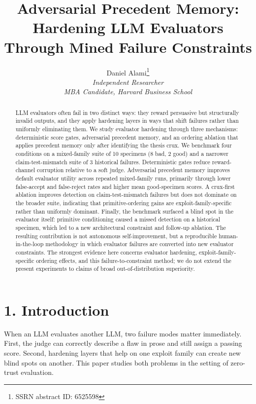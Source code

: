 \documentclass[
]{article}
\title{Adversarial Precedent Memory: Hardening LLM Evaluators Through Mined Failure Constraints}
\author{Daniel Alami\thanks{SSRN abstract ID: 6525598} \\
\normalsize \textit{Independent Researcher} \\
\normalsize \textit{MBA Candidate, Harvard Business School}}
\date{}
\begin{document}
\maketitle

\begin{abstract}

LLM evaluators often fail in two distinct ways: they reward persuasive
but structurally invalid outputs, and they apply hardening layers in
ways that shift failures rather than uniformly eliminating them. We
study evaluator hardening through three mechanisms: deterministic score
gates, adversarial precedent memory, and an ordering ablation that
applies precedent memory only after identifying the thesis crux. We
benchmark four conditions on a mixed-family suite of 10 specimens (8
bad, 2 good) and a narrower claim-test-mismatch suite of 3 historical
failures. Deterministic gates reduce reward-channel corruption relative
to a soft judge. Adversarial precedent memory improves default evaluator
utility across repeated mixed-family runs, primarily through lower
false-accept and false-reject rates and higher mean good-specimen
scores. A crux-first ablation improves detection on claim-test-mismatch
failures but does not dominate on the broader suite, indicating that
primitive-ordering gains are exploit-family-specific rather than
uniformly dominant. Finally, the benchmark surfaced a blind spot in the
evaluator itself: primitive conditioning caused a missed detection on a
historical specimen, which led to a new architectural constraint and
follow-up ablation. The resulting contribution is not autonomous
self-improvement, but a reproducible human-in-the-loop methodology in
which evaluator failures are converted into new evaluator constraints.
The strongest evidence here concerns evaluator hardening,
exploit-family-specific ordering effects, and this failure-to-constraint
method; we do not extend the present experiments to claims of broad
out-of-distribution superiority.
\end{abstract}

\section{1. Introduction}\label{1-introduction}

When an LLM evaluates another LLM, two failure modes matter immediately.
First, the judge can correctly describe a flaw in prose and still assign
a passing score. Second, hardening layers that help on one exploit
family can create new blind spots on another. This paper studies both
problems in the setting of zero-trust evaluation.
\end{document}
